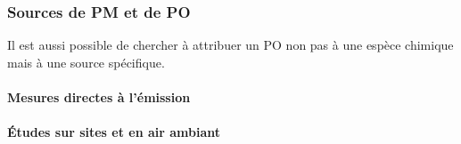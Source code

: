 

\subsubsection{Sources de PM et de PO}%
\label{ssub:sources_de_pm_et_de_po}


Il est aussi possible de chercher à attribuer un PO non pas à une espèce chimique mais à
une source spécifique.
\paragraph{Mesures directes à l'émission}%
\label{par:mesures_directes_à_l_émission}

\paragraph{Études sur sites et en air ambiant}%
\label{par:études_sur_sites_et_en_air_ambiant}

